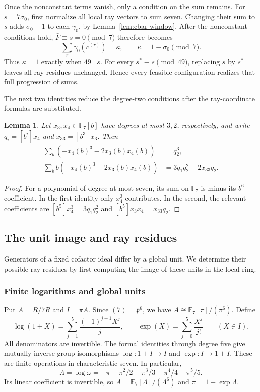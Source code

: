 \documentclass[11pt]{amsart}
\theoremstyle{plain}
\newtheorem{lemma}[theorem]{Lemma}
\theoremstyle{definition}
\numberwithin{equation}{section}
\newcommand{\F}{\mathbb F}
\newcommand{\pp}{\mathfrak p}
\begin{document}
Once the nonconstant terms vanish, only a condition on the sum remains.
For $s=7\sigma_0$, first normalize all local ray vectors to sum
seven. Changing their sum to $s$ adds $\sigma_0-1$ to each
$\gamma_0$, by Lemma~\ref{lem:cbar-window}. After the nonconstant
conditions hold, $\bar F\equiv s=0\pmod7$ therefore becomes
\begin{equation}\label{eq:kappa}
 \sum_r\gamma_0(\bar c^{(r)})=\kappa,
 \qquad \kappa=1-\sigma_0\pmod7.
\end{equation}
Thus $\kappa=1$ exactly when $49\mid s$.
For every $s^*\equiv s\pmod{49}$, replacing $s$ by $s^*$ leaves
all ray residues unchanged. Hence every feasible configuration
realizes that full progression of sums.

The next two identities reduce the degree-two conditions after
the ray-coordinate formulas are substituted.
\begin{lemma}\label{lem:identity}
Let $x_3,x_4\in\F_7[b]$ have degrees at most $3,2$, respectively,
and write $q_i=[b^i]x_4$ and $x_{33}=[b^3]x_3$. Then
\begin{align*}
 \sum_b(-x_4(b)^3-2x_3(b)x_4(b))&=q_2^3,\\
 \sum_b b(-x_4(b)^3-2x_3(b)x_4(b))
     &=3q_1q_2^2+2x_{33}q_2.
\end{align*}
\end{lemma}
\begin{proof}
For a polynomial of degree at most seven, its sum on $\F_7$ is
minus its $b^6$ coefficient. In the first identity only $x_4^3$
contributes. In the second, the relevant coefficients are
$[b^5]x_4^3=3q_1q_2^2$ and $[b^5]x_3x_4=x_{33}q_2$.
\end{proof}


\subsection{The unit image and ray residues}\label{sec:defect}

Generators of a fixed cofactor ideal differ by a global unit.
We determine their possible ray residues by first computing the
image of these units in the local ring.

\subsubsection{Finite logarithms and global units}

Put $A=R/7R$ and $I=\pi A$.  Since $(7)=\pp^6$, we have
$A\cong\F_7[\pi]/(\pi^6)$.  Define
\[
 \log(1+X)=\sum_{j=1}^{5}\frac{(-1)^{j+1}X^j}{j},\qquad
 \exp(X)=\sum_{j=0}^{5}\frac{X^j}{j!}\qquad(X\in I).
\]
All denominators are invertible. The formal identities through degree
five give mutually inverse group isomorphisms
$\log\colon1+I\longrightarrow I$ and $\exp\colon I\longrightarrow1+I$.
These are finite operations in characteristic seven. In particular,
\[
 \Lambda=\log\omega=-\pi-\pi^2/2-\pi^3/3-\pi^4/4-\pi^5/5.
\]
Its linear coefficient is invertible, so $A=\F_7[\Lambda]/(\Lambda^6)$
and $\pi=1-\exp\Lambda$.
\end{document}
